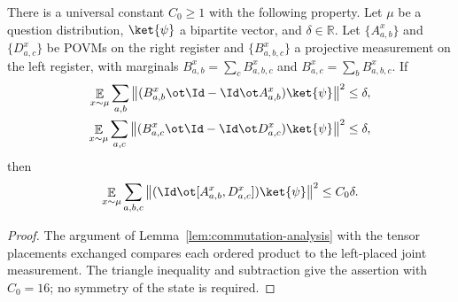 \begin{lemma}
	\label{lem:commutation-analysis-right}
	\leanok
	There is a universal constant $C_0 \ge 1$ with the following property.
	Let $\mu$ be a question distribution, $\ket{\psi}$ a bipartite vector,
	and $\delta \in \mathbb{R}$. Let $\{A^x_{a,b}\}$ and $\{D^x_{a,c}\}$
	be POVMs on the right register and $\{B^x_{a,b,c}\}$ a projective
	measurement on the left register, with marginals
	$B^x_{a,b}=\sum_c B^x_{a,b,c}$ and $B^x_{a,c}=\sum_b B^x_{a,b,c}$.
	If
	\begin{align*}
		\mathop{\mathbb{E}}_{x\sim\mu}\sum_{a,b}
		\big\|(B^x_{a,b}\ot\Id-\Id\ot A^x_{a,b})\ket{\psi}\big\|^2
		&\le \delta,\\
		\mathop{\mathbb{E}}_{x\sim\mu}\sum_{a,c}
		\big\|(B^x_{a,c}\ot\Id-\Id\ot D^x_{a,c})\ket{\psi}\big\|^2
		&\le \delta,
	\end{align*}
	then
	\[
		\mathop{\mathbb{E}}_{x\sim\mu}\sum_{a,b,c}
		\big\|(\Id\ot[A^x_{a,b},D^x_{a,c}])\ket{\psi}\big\|^2
		\le C_0\delta.
	\]
\end{lemma}
\begin{proof}
	\leanok
	The argument of Lemma~\ref{lem:commutation-analysis} with the tensor
	placements exchanged compares each ordered product to the left-placed
	joint measurement. The triangle inequality and subtraction give the
	assertion with $C_0=16$; no symmetry of the state is required.
\end{proof}

